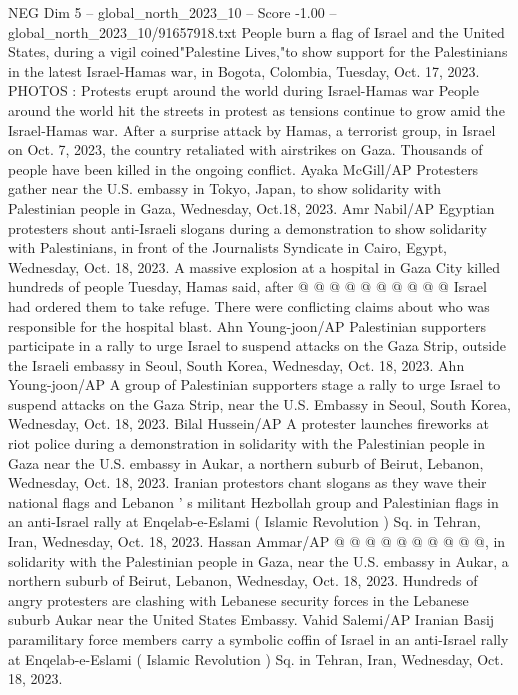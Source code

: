 \begin{textsample}{NEG Dim 5 – global\_north\_2023\_10 – Score -1.00 – global\_north\_2023\_10/91657918.txt}  \label{ex:f5_neg_023}
People burn a flag of Israel and the United States, during a vigil coined"Palestine Lives,"to show support for the Palestinians in the latest Israel-Hamas war, in Bogota, Colombia, Tuesday, Oct. 17, 2023.
PHOTOS : Protests erupt around the world during Israel-Hamas war People around the world hit the streets in protest as tensions continue to grow amid the Israel-Hamas war.
After a surprise attack by Hamas, a terrorist group, in Israel on Oct. 7, 2023, the country retaliated with airstrikes on Gaza.
Thousands of people have been killed in the ongoing conflict.
Ayaka McGill/AP Protesters gather near the U.S. embassy in Tokyo, Japan, to show solidarity with Palestinian people in Gaza, Wednesday, Oct.18, 2023.
Amr Nabil/AP Egyptian protesters shout anti-Israeli slogans during a demonstration to show solidarity with Palestinians, in front of the Journalists Syndicate in Cairo, Egypt, Wednesday, Oct. 18, 2023.
A massive explosion at a hospital in Gaza City killed hundreds of people Tuesday, Hamas said, after @ @ @ @ @ @ @ @ @ @ Israel had ordered them to take refuge.
There were conflicting claims about who was responsible for the hospital blast.
Ahn Young-joon/AP Palestinian supporters participate in a rally to urge Israel to suspend attacks on the Gaza Strip, outside the Israeli embassy in Seoul, South Korea, Wednesday, Oct. 18, 2023.
Ahn Young-joon/AP A group of Palestinian supporters stage a rally to urge Israel to suspend attacks on the Gaza Strip, near the U.S.
Embassy in Seoul, South Korea, Wednesday, Oct. 18, 2023.
Bilal Hussein/AP A protester launches fireworks at riot police during a demonstration in solidarity with the Palestinian people in Gaza near the U.S. embassy in Aukar, a northern suburb of Beirut, Lebanon, Wednesday, Oct. 18, 2023.
Iranian protestors chant slogans as they wave their national flags and Lebanon ' s militant Hezbollah group and Palestinian flags in an anti-Israel rally at Enqelab-e-Eslami ( Islamic Revolution ) Sq. in Tehran, Iran, Wednesday, Oct. 18, 2023.
Hassan Ammar/AP @ @ @ @ @ @ @ @ @ @, in solidarity with the Palestinian people in Gaza, near the U.S. embassy in Aukar, a northern suburb of Beirut, Lebanon, Wednesday, Oct. 18, 2023.
Hundreds of angry protesters are clashing with Lebanese security forces in the Lebanese suburb Aukar near the United States Embassy.
Vahid Salemi/AP Iranian Basij paramilitary force members carry a symbolic coffin of Israel in an anti-Israel rally at Enqelab-e-Eslami ( Islamic Revolution ) Sq. in Tehran, Iran, Wednesday, Oct. 18, 2023.

\end{textsample}
